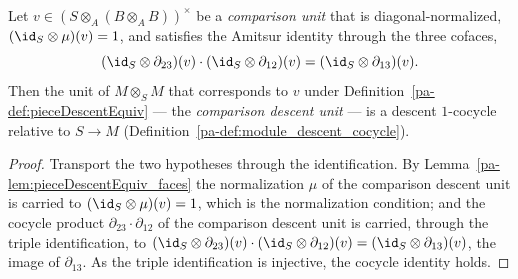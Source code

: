 \begin{theorem}
  \label{pa-thm:isDescentCocycle_comparisonDescentUnit}
  \leanok

  Let \(v \in (S \otimes_A (B \otimes_A B))^{\times}\) be a \emph{comparison unit} that is
  diagonal-normalized, \((\id_S \otimes \mu)(v) = 1\), and satisfies the Amitsur identity through
  the three cofaces,
  \[
    (\id_S \otimes \partial_{23})(v) \cdot (\id_S \otimes \partial_{12})(v) = (\id_S \otimes
    \partial_{13})(v) .
  \]
  Then the unit of \(M \otimes_S M\) that corresponds to \(v\) under
  Definition~\ref{pa-def:pieceDescentEquiv} --- the \emph{comparison descent unit} --- is a descent
  \(1\)-cocycle relative to \(S \to M\) (Definition~\ref{pa-def:module_descent_cocycle}).
\end{theorem}
\begin{proof}
  \leanok
  Transport the two hypotheses through the identification. By
  Lemma~\ref{pa-lem:pieceDescentEquiv_faces} the normalization \(\mu\) of the comparison descent unit
  is carried to \((\id_S \otimes \mu)(v) = 1\), which is the normalization condition; and the
  cocycle product \(\partial_{23} \cdot \partial_{12}\) of the comparison descent unit is carried,
  through the triple identification, to \((\id_S \otimes \partial_{23})(v) \cdot (\id_S \otimes
  \partial_{12})(v) = (\id_S \otimes \partial_{13})(v)\), the image of \(\partial_{13}\). As the
  triple identification is injective, the cocycle identity holds.
\end{proof}

